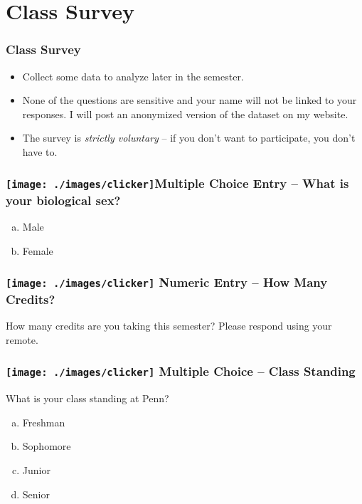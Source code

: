 \section{Class Survey}
\begin{frame}\frametitle{Class Survey}
 
\begin{itemize}
	\item Collect some data to analyze later in the semester.
	\item None of the questions are sensitive and your name will not be linked to your responses. I will post an anonymized version of the dataset on my website.
	\item The survey is \emph{strictly voluntary} -- if you don't want to participate, you don't have to.
\end{itemize}


\end{frame}


\begin{frame}

  \frametitle{\texttt{[image: ./images/clicker]}\hfill  Multiple Choice Entry -- What is your biological sex?}
\begin{enumerate}[(a)]
	\item Male
	\item Female
\end{enumerate}

\end{frame}

\begin{frame}

\frametitle{\texttt{[image: ./images/clicker]} \hfill  Numeric Entry -- How Many Credits?}

How many credits are you taking this semester? Please respond using your remote.

\end{frame}

\begin{frame}
  \frametitle{\texttt{[image: ./images/clicker]} \hfill Multiple Choice -- Class Standing} 
  What is your class standing at Penn?
  \begin{enumerate}[(a)]
    \item Freshman
    \item Sophomore
    \item Junior
    \item Senior
  \end{enumerate}
\end{frame}
%

